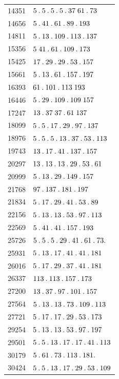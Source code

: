 \begin{longtable}{@{}r|l@{}}
14351 & $5\mathbin{.} 5\mathbin{.} 5\mathbin{.} 5\mathbin{.} 37\;61\mathbin{.} 73$\\
14656 & $5\mathbin{.} 41\mathbin{.} 61\mathbin{.} 89\mathbin{.} 193$\\
14811 & $5\mathbin{.} 13\mathbin{.} 109\mathbin{.} 113\mathbin{.} 137$\\
15356 & $5\;41\mathbin{.} 61\mathbin{.} 109\mathbin{.} 173$\\
15425 & $17\mathbin{.} 29\mathbin{.} 29\mathbin{.} 53\mathbin{.} 157$\\
15661 & $5\mathbin{.} 13\mathbin{.} 61\mathbin{.} 157\mathbin{.} 197$\\
16393 & $61\mathbin{.} 101\mathbin{.} 113\;193$\\
16446 & $5\mathbin{.} 29\mathbin{.} 109\mathbin{.} 109\;157$\\
17247 & $13\mathbin{.} 37\;37\mathbin{.} 61\;137$\\
18099 & $5\mathbin{.} 5\mathbin{.} 17\mathbin{.} 29\mathbin{.} 97\mathbin{.} 137$\\
18976 & $5\mathbin{.} 5\mathbin{.} 5\mathbin{.} 13\mathbin{.} 37\mathbin{.} 53\mathbin{.} 113$\\
19743 & $13\mathbin{.} 17\mathbin{.} 41\mathbin{.} 137\mathbin{.} 157$\\
20297 & $13\mathbin{.} 13\mathbin{.} 13\mathbin{.} 29\mathbin{.} 53\mathbin{.} 61$\\
20999 & $5\mathbin{.} 13\mathbin{.} 29\mathbin{.} 149\mathbin{.} 157$\\
21768 & $97\mathbin{.} 137\mathbin{.} 181\mathbin{.} 197$\\
21834 & $5\mathbin{.} 17\mathbin{.} 29\mathbin{.} 41\mathbin{.} 53\mathbin{.} 89$\\
22156 & $5\mathbin{.} 13\mathbin{.} 13\mathbin{.} 53\mathbin{.} 97\mathbin{.} 113$\\
22569 & $5\mathbin{.} 41\mathbin{.} 41\mathbin{.} 157\mathbin{.} 193$\\
25726 & $5\mathbin{.} 5\mathbin{.} 5\mathbin{.} 29\mathbin{.} 41\mathbin{.} 61\mathbin{.} 73\mathbin{.} $\\
25931 & $5\mathbin{.} 13\mathbin{.} 17\mathbin{.} 41\mathbin{.} 41\mathbin{.} 181$\\
26016 & $5\mathbin{.} 17\mathbin{.} 29\mathbin{.} 37\mathbin{.} 41\mathbin{.} 181$\\
26337 & $113\mathbin{.} 113\mathbin{.} 157\mathbin{.} 173$\\
27200 & $13\mathbin{.} 37\mathbin{.} 97\mathbin{.} 101\mathbin{.} 157$\\
27564 & $5\mathbin{.} 13\mathbin{.} 13\mathbin{.} 73\mathbin{.} 109\mathbin{.} 113$\\
27721 & $5\mathbin{.} 17\mathbin{.} 17\mathbin{.} 29\mathbin{.} 53\mathbin{.} 173$\\
29254 & $5\mathbin{.} 13\mathbin{.} 13\mathbin{.} 53\mathbin{.} 97\mathbin{.} 197$\\
29501 & $5\mathbin{.} 5\mathbin{.} 13\mathbin{.} 17\mathbin{.} 17\mathbin{.} 41\mathbin{.} 113$\\
30179 & $5\mathbin{.} 61\mathbin{.} 73\mathbin{.} 113\mathbin{.} 181\mathbin{.} $\\
30424 & $5\mathbin{.} 5\mathbin{.} 13\mathbin{.} 17\mathbin{.} 29\mathbin{.} 53\mathbin{.} 109$\\

\end{longtable}
